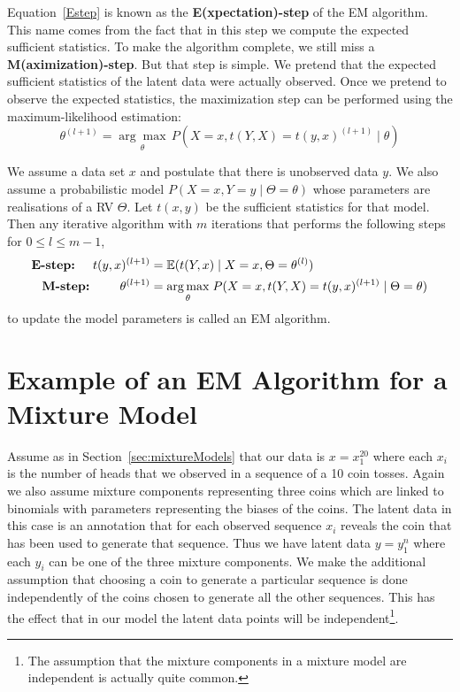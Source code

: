 \documentclass[a4paper,11pt,leqno]{report}\usepackage[]{graphicx}\usepackage[]{color}
\newcommand{\E}{\mathbb{E}}
\begin{document}
Equation~\eqref{Estep} is known as the \textbf{E(xpectation)-step} of the EM algorithm. This name
comes from the fact that in this step we compute the expected sufficient statistics. 
To make the algorithm complete, we still miss a
\textbf{M(aximization)-step}. But that step is simple. We pretend that the expected sufficient statistics of 
the latent data were actually observed. Once we pretend to observe the expected statistics, the maximization 
step can be performed using the maximum-likelihood estimation:
\begin{equation} \label{Mstep}
\theta^{(l+1)} = \underset{\theta}{\arg\max} \, P(X=x, t(Y,X) = t(y,x)^{(l+1)} \mid \theta)
\end{equation}

\begin{Definition}[EM algorithm]\label{def:EM}
We assume a data set $ x $ and postulate that there is unobserved data $ y $. We also
assume a probabilistic model $ P(X=x,Y=y \mid \Theta = \theta) $ whose parameters are realisations of a RV
$ \Theta $. Let $ t(x,y) $ be the sufficient statistics for that model. Then any
iterative algorithm with $ m $ iterations that performs the following
steps for $0\leq l \leq m-1$, 
\begin{align*}
\mbox{\textbf{E-step:} } \quad t(y,x)^{(l+1)} &= \E(t(Y,x) \mid X = x, \Theta = \theta^{(l)}) \\
\mbox{\textbf{M-step:} } \qquad \theta^{(l+1)} &= \underset{\theta}{\arg\max} \; P(X=x, t(Y,X) = t(y,x)^{(l+1)} \mid \Theta = \theta) 
\end{align*}
to update the model parameters is called an EM algorithm. 
\end{Definition}

\section{Example of an EM Algorithm for a Mixture Model}\label{sec:EMExample}

Assume as in Section~\ref{sec:mixtureModels} that our data is $ x=x^{20}_{1} $ where each $ x_{i} $ is the 
number of heads that we observed in a sequence of a 10 coin tosses. Again we also assume mixture components representing three coins which are linked
to binomials with parameters representing the biases of the coins. 
The latent data in this case is an annotation that for each observed sequence $ x_{i} $ reveals the coin that has been used
to generate that sequence. Thus we have latent data $ y=y_{1}^{n} $ where each $ y_{i} $ can be one of the three mixture components. 
We make the additional assumption that choosing a coin to generate a particular sequence is done independently of the coins chosen
to generate all the other sequences. This has the effect that in our model the latent data points will be independent\footnote{The assumption
that the mixture components in a mixture model are independent is actually quite common.}.
\end{document}
